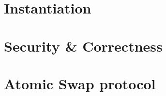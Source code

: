 \section{Instantiation}\label{sec:atom:inst}


\section{Security \& Correctness} \label{sec:atom:security}


\section{Atomic Swap protocol}\label{sec:atom:atomic-swap}
